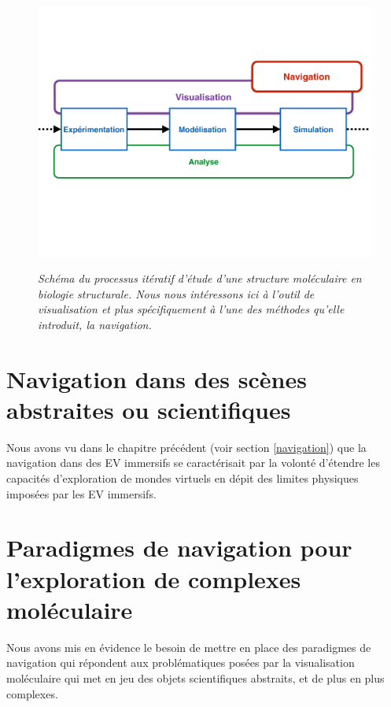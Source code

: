 \begin{figure}
  \centering
  {\includegraphics[width=1.0\linewidth]{./figures/ch3/process_bio_struct_navigation}}
    \caption[Schéma du processus itératif d'étude d'une structure moléculaire en biologie structurale.]{\it Schéma du processus itératif d'étude d'une structure moléculaire en biologie structurale. Nous nous intéressons ici à l'outil de visualisation et plus spécifiquement à l'une des méthodes qu'elle introduit, la navigation.}
  \label{Fig:process_bio_struct_navigation}
  \hspace{0.3cm}
\end{figure}

\section{Navigation dans des scènes abstraites ou scientifiques}

Nous avons vu dans le chapitre précédent (voir section \ref{navigation}) que la navigation dans des EV immersifs se caractérisait par la volonté d'étendre les capacités d'exploration de mondes virtuels en dépit des limites physiques imposées par les EV immersifs.

\section{Paradigmes de navigation pour l'exploration de complexes moléculaire}

Nous avons mis en évidence le besoin de mettre en place des paradigmes de navigation qui répondent aux problématiques posées par la visualisation moléculaire qui met en jeu des objets scientifiques abstraits, et de plus en plus complexes.

